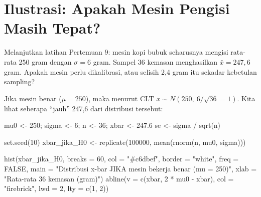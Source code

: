 \documentclass[
  indonesian,
  letterpaper,
]{book}
\newenvironment{Shaded}{\begin{snugshade}}{\end{snugshade}}
\newcommand{\AttributeTok}[1]{\textcolor[rgb]{0.40,0.45,0.13}{#1}}
\newcommand{\ConstantTok}[1]{\textcolor[rgb]{0.56,0.35,0.01}{#1}}
\newcommand{\DecValTok}[1]{\textcolor[rgb]{0.68,0.00,0.00}{#1}}
\newcommand{\FloatTok}[1]{\textcolor[rgb]{0.68,0.00,0.00}{#1}}
\newcommand{\FunctionTok}[1]{\textcolor[rgb]{0.28,0.35,0.67}{#1}}
\newcommand{\NormalTok}[1]{\textcolor[rgb]{0.00,0.23,0.31}{#1}}
\newcommand{\OtherTok}[1]{\textcolor[rgb]{0.00,0.23,0.31}{#1}}
\newcommand{\SpecialCharTok}[1]{\textcolor[rgb]{0.37,0.37,0.37}{#1}}
\newcommand{\StringTok}[1]{\textcolor[rgb]{0.13,0.47,0.30}{#1}}
\begin{document}
\section{Ilustrasi: Apakah Mesin Pengisi Masih
Tepat?}\label{ilustrasi-apakah-mesin-pengisi-masih-tepat}

Melanjutkan latihan Pertemuan 9: mesin kopi bubuk seharusnya mengisi
rata-rata 250 gram dengan \(\sigma = 6\) gram. Sampel 36 kemasan
menghasilkan \(\bar{x} = 247{,}6\) gram. Apakah mesin perlu dikalibrasi,
atau selisih 2,4 gram itu sekadar kebetulan sampling?

Jika mesin benar (\(\mu = 250\)), maka menurut CLT
\(\bar{x} \sim N(250,\ 6/\sqrt{36} = 1)\). Kita lihat seberapa ``jauh''
247,6 dari distribusi tersebut:

\begin{Shaded}
\begin{Highlighting}[]
\NormalTok{mu0 }\OtherTok{\textless{}{-}} \DecValTok{250}\NormalTok{; sigma }\OtherTok{\textless{}{-}} \DecValTok{6}\NormalTok{; n }\OtherTok{\textless{}{-}} \DecValTok{36}\NormalTok{; xbar }\OtherTok{\textless{}{-}} \FloatTok{247.6}
\NormalTok{se }\OtherTok{\textless{}{-}}\NormalTok{ sigma }\SpecialCharTok{/} \FunctionTok{sqrt}\NormalTok{(n)}

\FunctionTok{set.seed}\NormalTok{(}\DecValTok{10}\NormalTok{)}
\NormalTok{xbar\_jika\_H0 }\OtherTok{\textless{}{-}} \FunctionTok{replicate}\NormalTok{(}\DecValTok{100000}\NormalTok{, }\FunctionTok{mean}\NormalTok{(}\FunctionTok{rnorm}\NormalTok{(n, mu0, sigma)))}

\FunctionTok{hist}\NormalTok{(xbar\_jika\_H0, }\AttributeTok{breaks =} \DecValTok{60}\NormalTok{, }\AttributeTok{col =} \StringTok{"\#c6dbef"}\NormalTok{, }\AttributeTok{border =} \StringTok{"white"}\NormalTok{, }\AttributeTok{freq =} \ConstantTok{FALSE}\NormalTok{,}
     \AttributeTok{main =} \StringTok{"Distribusi x{-}bar JIKA mesin bekerja benar (mu = 250)"}\NormalTok{,}
     \AttributeTok{xlab =} \StringTok{"Rata{-}rata 36 kemasan (gram)"}\NormalTok{)}
\FunctionTok{abline}\NormalTok{(}\AttributeTok{v =} \FunctionTok{c}\NormalTok{(xbar, }\DecValTok{2} \SpecialCharTok{*}\NormalTok{ mu0 }\SpecialCharTok{{-}}\NormalTok{ xbar), }\AttributeTok{col =} \StringTok{"firebrick"}\NormalTok{, }\AttributeTok{lwd =} \DecValTok{2}\NormalTok{, }\AttributeTok{lty =} \FunctionTok{c}\NormalTok{(}\DecValTok{1}\NormalTok{, }\DecValTok{2}\NormalTok{))}
\end{Highlighting}
\end{Shaded}
\end{document}
